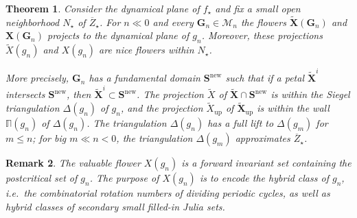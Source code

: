 \documentclass{amsart}
\newcommand{\1}{{\mathbb 1 }}
\newcommand\MM{\mathscr{M}}
\newcommand\bMM{{\pmb {\MM}}}
\newcommand{\bDelta}{{\mathbb{\Delta}}}
\newcommand{\bPi}{{\mathbb{\Pi}}}
\newcommand{\bX}{{\mathbf X}}
\newcommand{\bS}{{\mathbf S}}
\newcommand{\bG}{{\mathbf G}}
\newcommand{\str}{{\star}}
\newcommand\up{{\operatorname{up}}}
\newcommand\new{{\operatorname{new}}}
\newtheorem{thm}{Theorem}[section]
\newtheorem{rem}[thm]{Remark}
\theoremstyle{remark}
\numberwithin{equation}{section}
\theoremstyle{definition}
\theoremstyle{nonumberbreak}
\begin{document}
\begin{thm}
\label{thm:proj of val flow}
Consider the dynamical plane of $f_\str$ and fix a small open neighborhood $N_\str$ of $\overline Z_\str$. For $n\ll 0$ and every $\bG_n\in \bMM_n$ the flowers $\widetilde \bX(\bG_n)$ and $\bX(\bG_n)$ projects to the dynamical plane of $g_n$. Moreover, these projections $\widetilde X(g_n)$ and $X(g_n)$ are nice flowers within $N_\str$.

More precisely, $\bG_n$ has a fundamental domain $\bS^\new$ such that if a petal $\widetilde \bX^i$ intersects $\bS^\new$, then $\widetilde \bX^i\subset \bS^\new$. The projection $\widetilde X$ of $\widetilde \bX\cap \bS^\new$ is within the Siegel triangulation $\bDelta(g_n)$ of $g_n$, and the projection $\widetilde X_\up$ of $\widetilde \bX_\up$ is within the wall $\bPi(g_n)$ of $\bDelta(g_n)$. The triangulation $\bDelta(g_n)$ has a full lift to $\bDelta(g_m)$ for $m\le n$; for big $m\ll n<0$, the triangulation $\bDelta(g_m)$ approximates $\overline Z_\str$. 
\end{thm}
\begin{rem}The valuable flower $X(g_n)$ is a forward invariant set containing the postcritical set of $g_n$. The purpose of $X(g_n)$ is to encode the hybrid class of $g_n$, i.e.~the combinatorial rotation numbers of dividing periodic cycles, as well as hybrid classes of secondary small filled-in Julia sets. 
\end{rem}
\end{document}
